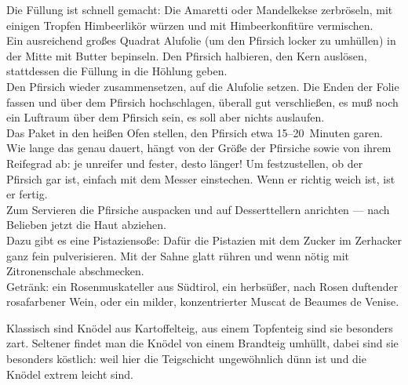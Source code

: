       \begin{zubereitung}
        Die Füllung ist schnell gemacht: Die Amaretti oder Mandelkekse
	zerbröseln, mit einigen Tropfen Himbeerlikör würzen und mit
	Himbeerkonfitüre vermischen. \\
	Ein ausreichend großes Quadrat Alufolie (um den Pfirsich locker zu
	umhüllen) in der Mitte mit Butter bepinseln. Den Pfirsich halbieren,
	den Kern auslösen, stattdessen die Füllung in die Höhlung geben. \\
	Den Pfirsich wieder zusammensetzen, auf die Alufolie setzen. Die Enden
	der Folie fassen und über dem Pfirsich hochschlagen, überall gut
	verschließen, es muß noch ein Luftraum über dem Pfirsich sein, es soll
	aber nichts auslaufen. \\
	Das Paket in den  heißen Ofen stellen, den Pfirsich etwa
	15--20~Minuten garen. Wie lange das genau dauert, hängt von der Größe
	der Pfirsiche sowie von ihrem Reifegrad ab: je unreifer und fester,
	desto länger! Um festzustellen, ob der Pfirsich gar ist, einfach mit
	dem Messer einstechen. Wenn er richtig weich ist, ist er fertig. \\
	Zum Servieren die Pfirsiche auspacken und auf Desserttellern anrichten
	--- nach Belieben jetzt die Haut abziehen. \\
	Dazu gibt es eine Pistaziensoße: Dafür die Pistazien mit dem Zucker
	im Zerhacker ganz fein pulverisieren. Mit der Sahne glatt rühren und
	wenn nötig mit Zitronenschale abschmecken. \\
	Getränk: ein Rosenmuskateller aus Südtirol, ein herbsüßer, nach Rosen
	duftender rosafarbener Wein, oder ein milder, konzentrierter Muscat
	de Beaumes de Venise. \\
      \end{zubereitung}


      \begin{einleitung}
        Klassisch sind Knödel aus Kartoffelteig, aus einem Topfenteig sind sie
        besonders zart. Seltener findet man die Knödel von einem Brandteig
        umhüllt, dabei sind sie besonders köstlich: weil hier die Teigschicht
        ungewöhnlich dünn ist und die Knödel extrem leicht sind. \\
      \end{einleitung}

